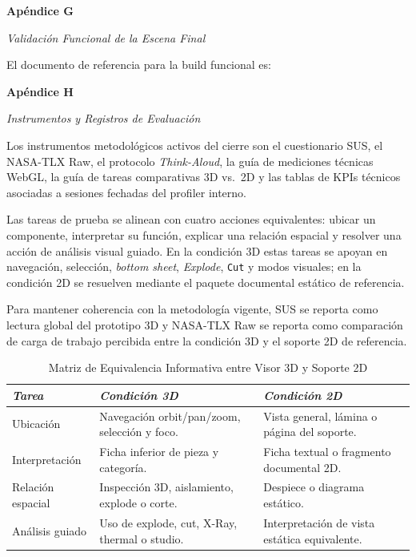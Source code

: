 \clearpage
{}
\label{apendice:G}
{\noindent\textbf{Apéndice G}\par
\noindent\textit{Validación Funcional de la Escena Final}\par}

El documento de referencia para la build funcional es:
\begin{center}
\end{center}

\clearpage
{}
\label{apendice:H}
{\noindent\textbf{Apéndice H}\par
\noindent\textit{Instrumentos y Registros de Evaluación}\par}

Los instrumentos metodológicos activos del cierre son el cuestionario SUS, el NASA-TLX Raw, el protocolo \textit{Think-Aloud}, la guía de mediciones técnicas WebGL, la guía de tareas comparativas 3D vs.\ 2D y las tablas de KPIs técnicos asociadas a sesiones fechadas del profiler interno.

Las tareas de prueba se alinean con cuatro acciones equivalentes: ubicar un componente, interpretar su función, explicar una relación espacial y resolver una acción de análisis visual guiado. En la condición 3D estas tareas se apoyan en navegación, selección, \textit{bottom sheet}, \textit{Explode}, \texttt{Cut} y modos visuales; en la condición 2D se resuelven mediante el paquete documental estático de referencia.

Para mantener coherencia con la metodología vigente, SUS se reporta como lectura global del prototipo 3D y NASA-TLX Raw se reporta como comparación de carga de trabajo percibida entre la condición 3D y el soporte 2D de referencia.

\begin{table}[htbp]
    \caption*{Matriz de Equivalencia Informativa entre Visor 3D y Soporte 2D}
    \begin{tabularx}{\textwidth}{p{3.2cm}XX}
        \hline
        \textit{Tarea} & \textit{Condición 3D} & \textit{Condición 2D} \\ \hline
        Ubicación & Navegación orbit/pan/zoom, selección y foco. & Vista general, lámina o página del soporte. \\
        Interpretación & Ficha inferior de pieza y categoría. & Ficha textual o fragmento documental 2D. \\
        Relación espacial & Inspección 3D, aislamiento, explode o corte. & Despiece o diagrama estático. \\
        Análisis guiado & Uso de explode, cut, X-Ray, thermal o studio. & Interpretación de vista estática equivalente. \\ \hline
    \end{tabularx}
\end{table}

